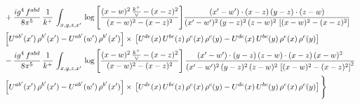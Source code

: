 \documentclass[10pt]{article}
\numberwithin{equation}{section}
\begin{document}
\begin{align}
& +\frac{ig^{4}\, f^{abd}}{8\pi^{5}}\, \frac{1}{k^{+}}\, \int_{x,y,z,x'}\,\log{\left[\frac{(x-w)^{2}\,\frac{k^{+}}{\vee}-(x-z)^{2}}{(x-w)^{2}-(x-z)^{2}}\right]}\frac{(x'-w')\cdot (x-z)\, (y-z)\cdot (z-w)}{(x'-w')^{2}\, (y-z)^{2}\, (z-w)^{2}\,\left[(x-w)^{2} -(x-z)^{2}\right]}\, \notag \\ & \left[U^{ab'}(x')\,\rho^{b'}(x')-U^{ab'}(w')\, \rho^{b'}(x')\right]\times\,\left[U^{de}(x)\,U^{bc}(z)\, \rho^{e}(x)\,\rho^{c}(y)-U^{de}(x)\,U^{bc}(y)\,\rho^{e}(x)\,\rho^{c}(y)\right] \notag \\
& -\frac{ig^{4}\, f^{abd}}{8\pi^{5}}\, \frac{1}{k^{+}}\, \int_{x,y,z,x'}\,\log{\left[\frac{(x-w)^{2}\,\frac{k^{+}}{\vee}-(x-z)^{2}}{(x-w)^{2}-(x-z)^{2}}\right]}\,\frac{(x'-w')\cdot (y-z)\, (z-w)\cdot (x-z)\,(x-w)^{2}}{(x'-w')^{2}\, (y-z)^{2}\, (z-w)^{2}\,\left[(x-w)^{2}-(x-z)^{2}\right]^{2}}\, \notag \\ & \left[U^{ab'}(x')\,\rho^{b'}(x')-U^{ab'}(w')\, \rho^{b'}(x')\right]\times\,\left[U^{de}(x)\,U^{bc}(z)\, \rho^{e}(x)\,\rho^{c}(y)-U^{de}(x)\,U^{bc}(y)\,\rho^{e}(x)\,\rho^{c}(y)\right]\Bigg\} \label{eq:F:G1IIIN2}
\end{align}
\end{document}
